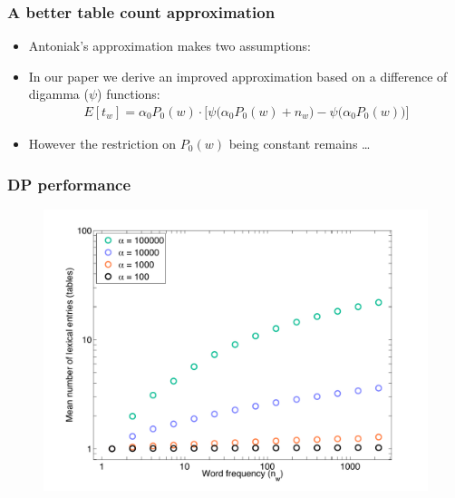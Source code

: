 \documentclass{beamer}
\newenvironment{unpacked_itemize}{
\begin{itemize}
  \setlength{\itemsep}{10pt}
  \setlength{\parskip}{0pt}
  \setlength{\parsep}{0pt}
}{\end{itemize}}
\begin{document}
\begin{frame}
\frametitle{A better table count approximation}
\begin{itemize}
\item Antoniak's approximation makes two assumptions:
\vspace{1.0cm}
\item In our paper we derive an improved approximation based on a difference of digamma ($\psi$) functions:
\begin{align}
\nonumber E[t_w] = \alpha_0 P_0(w) \cdot \Bigg [\psi{\Big (\alpha_0
P_0(w)+n_w \Big)} - \psi{\Big (\alpha_0 P_0(w)} \Big ) \Bigg ]
\end{align}
\vspace{0.5cm}
\item However the restriction on $P_0(w)$ being constant remains \dots
\end{itemize}
\end{frame}

\begin{frame}
\frametitle{DP performance}
\begin{figure}
{\centering \includegraphics[scale=0.45]{code/plot0.pdf}}
\end{figure}
\end{frame}
\end{document}
